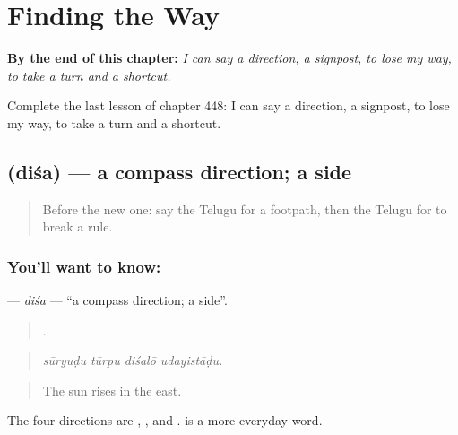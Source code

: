 
\chapter{Finding the Way}
\label{ch:te-finding-the-way}

\begin{chapteropening}
\textbf{By the end of this chapter:} \emph{I can say a direction, a signpost, to lose my way, to take a turn and a shortcut.}

Complete the last lesson of chapter 448: I can say a direction, a signpost, to lose my way, to take a turn and a shortcut.
\end{chapteropening}

\section[\texorpdfstring{\te{దిశ} (diśa)}{దిశ (diśa)}]{ (diśa) — a compass direction; a side}

\label{lesson:TE-C448-disa}



\begin{quote}
Before the new one: say the Telugu for a footpath, then the Telugu for to break a rule.
\end{quote}

\subsection*{You'll want to know: }
\textbf{} — \emph{diśa} — \textquotedblleft{}a compass direction; a side\textquotedblright{}.

\begin{quote}
   .
\end{quote}

\begin{quote}
\emph{sūryuḍu tūrpu diśalō udayistāḍu.}
\end{quote}

\begin{quote}
The sun rises in the east.
\end{quote}

The four directions are , ,  and .  is a more everyday word.

